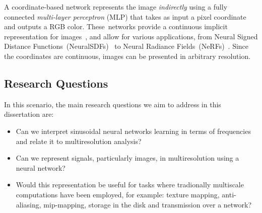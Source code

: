 A coordinate-based network represents the image \emph{indirectly} using a fully connected \textit{multi-layer perceptron} (MLP) that takes as input a pixel coordinate and outputs a RGB color. These~networks provide a continuous implicit representation for images~\cite{chen2021learning}, and allow for various applications, from Neural Signed Distance Functions~(NeuralSDFs)~\cite{park2019deepsdf} to Neural Radiance Fields~(NeRFs)~\cite{2020nerf}. Since the coordinates are continuous, images can be presented in arbitrary resolution.







\subsection{Research Questions}

In this scenario, the main research questions we aim to address in this dissertation are:

\begin{itemize}
    \item Can we interpret sinusoidal neural networks learning in terms of frequencies and relate it to multiresolution analysis? 
    \item Can we represent signals, particularly images, in multiresolution using a neural network?
    \item Would this representation be useful for tasks where tradionally multiscale computations have been employed, for example: texture mapping, anti-aliasing, mip-mapping, storage in the disk and transmission over a network?
\end{itemize}  

